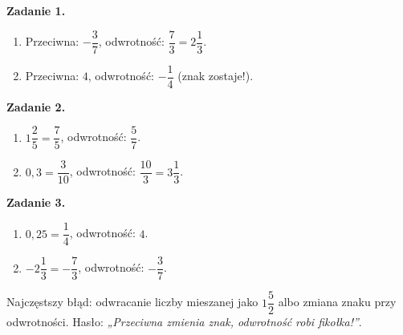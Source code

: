 \documentclass[11pt,a4paper]{article}
\begin{document}

\vspace{0.6em}
\textbf{Zadanie 1.}
\begin{enumerate}[label=\alph*), leftmargin=*, itemsep=4pt]
  \item Przeciwna: $-\dfrac{3}{7}$, odwrotność: $\dfrac{7}{3}=2\dfrac{1}{3}$.
  \item Przeciwna: $4$, odwrotność: $-\dfrac{1}{4}$ (znak zostaje!).
\end{enumerate}

\textbf{Zadanie 2.}
\begin{enumerate}[label=\alph*), leftmargin=*, itemsep=4pt]
  \item $1\dfrac{2}{5}=\dfrac{7}{5}$, odwrotność: $\dfrac{5}{7}$.
  \item $0{,}3=\dfrac{3}{10}$, odwrotność: $\dfrac{10}{3}=3\dfrac{1}{3}$.
\end{enumerate}

\textbf{Zadanie 3.}
\begin{enumerate}[label=\alph*), leftmargin=*, itemsep=4pt]
  \item $0{,}25=\dfrac{1}{4}$, odwrotność: $4$.
  \item $-2\dfrac{1}{3}=-\dfrac{7}{3}$, odwrotność: $-\dfrac{3}{7}$.
\end{enumerate}

\vspace{0.6em}
\begin{tcolorbox}[colback=white, colframe=okres, boxrule=0.6pt, arc=2pt, title=Wskazówka dla Pawła]
Najczęstszy błąd: odwracanie liczby mieszanej jako $1\dfrac{5}{2}$ albo zmiana znaku przy odwrotności. Hasło: \emph{„Przeciwna zmienia znak, odwrotność robi fikołka!”}.
\end{tcolorbox}
\end{document}
